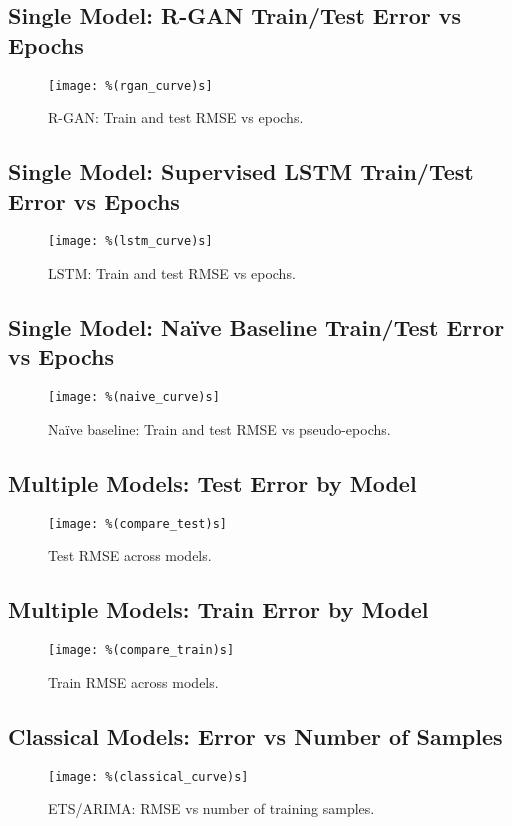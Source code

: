 \documentclass[11pt]{article}
\begin{document}
\subsection{Single Model: R-GAN Train/Test Error vs Epochs}
\begin{figure}[h]
\centering
\texttt{[image: \%(rgan\_curve)s]}
\caption{R-GAN: Train and test RMSE vs epochs.}
\end{figure}

\subsection{Single Model: Supervised LSTM Train/Test Error vs Epochs}
\begin{figure}[h]
\centering
\texttt{[image: \%(lstm\_curve)s]}
\caption{LSTM: Train and test RMSE vs epochs.}
\end{figure}

\subsection{Single Model: Naïve Baseline Train/Test Error vs Epochs}
\begin{figure}[h]
\centering
\texttt{[image: \%(naive\_curve)s]}
\caption{Naïve baseline: Train and test RMSE vs pseudo-epochs.}
\end{figure}

\subsection{Multiple Models: Test Error by Model}
\begin{figure}[h]
\centering
\texttt{[image: \%(compare\_test)s]}
\caption{Test RMSE across models.}
\end{figure}

\subsection{Multiple Models: Train Error by Model}
\begin{figure}[h]
\centering
\texttt{[image: \%(compare\_train)s]}
\caption{Train RMSE across models.}
\end{figure}

\subsection{Classical Models: Error vs Number of Samples}
\begin{figure}[h]
\centering
\texttt{[image: \%(classical\_curve)s]}
\caption{ETS/ARIMA: RMSE vs number of training samples.}
\end{figure}
\end{document}
